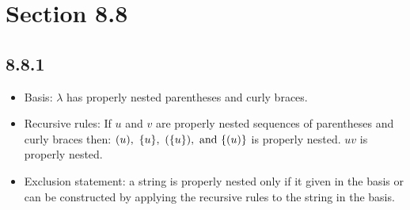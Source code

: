 \documentclass{article}
\begin{document}
\section*{Section 8.8}

\subsection*{8.8.1}
\begin{enumerate}
  \begin{itemize}
    \item Basis: $\lambda$ has properly nested parentheses and curly braces.
    \item Recursive rules: If $u$ and $v$ are properly nested sequences of parentheses and curly braces then:
           $(u),~\{u\},~(\{u\}), \operatorname{~\text{and}~} \{(u)\}$ is properly nested.
           $uv$ is properly nested.
    \item Exclusion statement: a string is properly nested only if it given in the basis or can be constructed by applying the recursive rules to the string in the basis.
  \end{itemize}
\end{enumerate}
\end{document}
